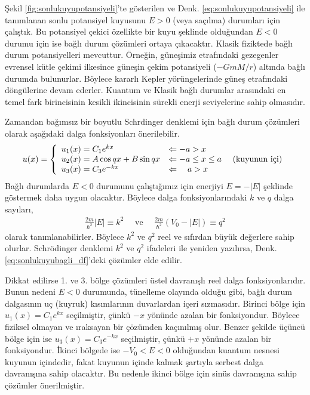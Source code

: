 \documentclass[a4paper,12pt, twoside]{article}
\begin{document}
Şekil \ref{fig:sonlukuyupotansiyeli}'te gösterilen ve Denk. \ref{eq:sonlukuyupotansiyeli} ile tanımlanan sonlu potansiyel kuyusunu $E>0$ (veya saçılma) durumları için çalıştık. Bu potansiyel çekici özellikte bir kuyu şeklinde olduğundan $E<0$ durumu için ise bağlı durum çözümleri ortaya çıkacaktır. Klasik fiziktede bağlı durum potansiyelleri mevcuttur. Örneğin, güneşimiz etrafındaki gezegenler evrensel kütle çekimi ilkesince güneşin çekim potansiyeli ($-G m M/r$) altında bağlı durumda bulunurlar. Böylece kararlı Kepler yörüngelerinde güneş etrafındaki döngülerine devam ederler. Kuantum ve Klasik bağlı durumlar arasındaki en temel fark birincisinin kesikli ikincisinin sürekli enerji seviyelerine sahip olmasıdır.

Zamandan bağımsız bir boyutlu Schrdinger denklemi için bağlı durum çözümleri olarak aşağıdaki dalga fonksiyonları önerilebilir.
\begin{align}
u ( x )  = \left\{ 
\begin{array} { l l } 
{u_1(x) = C_1 e^{ k x} } & {\Leftarrow -a > x } \\
{u_2(x) = A \cos q x + B \sin q x } & {\Leftarrow -a \leq x \leq a } \quad \text{ (kuyunun içi)} \\
{u_3(x) = C_3 e^{- k x}} & {\Leftarrow \quad a > x }
\end{array} \right. 
\label{eq:sonlukuyubagli_df}
\end{align}
Bağlı durumlarda $E<0$ durumunu çalıştığımız için enerjiyi $E = -|E|$ şeklinde göstermek daha uygun olacaktır. Böylece dalga fonksiyonlarındaki $k$ ve $q$ dalga sayıları,
\begin{align}
\frac{2 m }{\hbar^{2}} |E| \equiv k^{2} \quad
\text{ ve } \quad \frac{2 m }{\hbar^{2}} (V_0-|E|) \equiv q^{2}
\end{align}
olarak tanımlanabilirler. Böylece $k^2$ ve $q^2$ reel ve sıfırdan büyük değerlere sahip olurlar. Schrödinger denklemi $k^2$ ve $q^2$ ifadeleri ile yeniden yazılırsa, Denk. \ref{eq:sonlukuyubagli_df}'deki çözümler elde edilir. 

Dikkat edilirse 1. ve 3. bölge çözümleri üstel davranışlı reel dalga fonksiyonlarıdır. Bunun nedeni $E<0$ durumunda, tünelleme olayında olduğu gibi, bağlı durum dalgasının uç (kuyruk) kısımlarının duvarlardan içeri sızmasıdır. Birinci bölge için ${u_1(x) = C_1 e^{ k x} }$ seçilmiştir, çünkü $-x$ yönünde azalan bir fonksiyondur. Böylece fiziksel olmayan ve ıraksayan bir çözümden kaçınılmış olur. Benzer şekilde üçüncü bölge için ise ${u_3(x) = C_3 e^{ -k x} }$ seçilmiştir, çünkü $+x$ yönünde azalan bir fonksiyondur. İkinci bölgede ise $-V_0<E<0$ olduğundan kuantum nesnesi kuyunun içindedir, fakat kuyunun içinde kalmak şartıyla serbest dalga davranışına sahip olacaktır. Bu nedenle ikinci bölge için sinüs davranışına sahip çözümler önerilmiştir.
\end{document}
